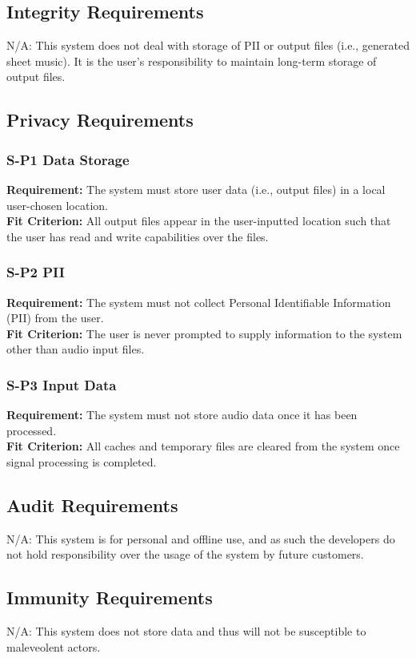 \documentclass[12pt]{article}
\begin{document}
\subsection{Integrity Requirements}
N/A: This system does not deal with storage of PII or output files (i.e., generated sheet music). It is the user's responsibility to maintain long-term storage of output files.

\subsection{Privacy Requirements}
\subsubsection*{S-P1 Data Storage}
\textbf{Requirement:} The system must store user data (i.e., output files) in a local user-chosen location. \\ 
\textbf{Fit Criterion:} All output files appear in the user-inputted location such that the user has read and write capabilities over the files. 
\subsubsection*{S-P2 PII}
\textbf{Requirement:} The system must not collect Personal Identifiable Information (PII) from the user. \\ 
\textbf{Fit Criterion:} The user is never prompted to supply information to the system other than audio input files. 
\subsubsection*{S-P3 Input Data}
\textbf{Requirement:} The system must not store audio data once it has been processed. \\ 
\textbf{Fit Criterion:} All caches and temporary files are cleared from the system once signal processing is completed.

\subsection{Audit Requirements}
N/A: This system is for personal and offline use, and as such the developers do not hold responsibility over the usage of the system by future customers.
\subsection{Immunity Requirements}
N/A: This system does not store data and thus will not be susceptible to maleveolent actors.
\end{document}
